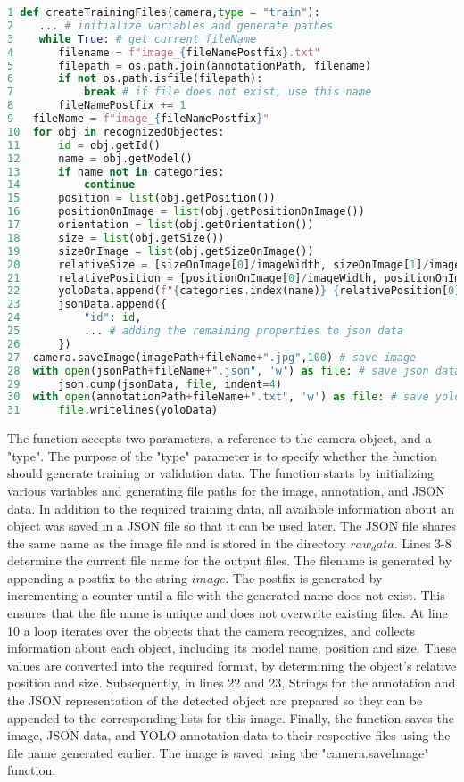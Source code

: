 \begin{lstlisting}[language=python]
1 def createTrainingFiles(camera,type = "train"):
2    ... # initialize variables and generate pathes
3    while True: # get current fileName
4       filename = f"image_{fileNamePostfix}.txt"
5       filepath = os.path.join(annotationPath, filename)
6       if not os.path.isfile(filepath): 
7           break # if file does not exist, use this name
8       fileNamePostfix += 1
9   fileName = f"image_{fileNamePostfix}"
10  for obj in recognizedObjectes:
11      id = obj.getId()
12      name = obj.getModel()
13      if name not in categories:
14          continue
15      position = list(obj.getPosition())
16      positionOnImage = list(obj.getPositionOnImage())
17      orientation = list(obj.getOrientation())
18      size = list(obj.getSize())
19      sizeOnImage = list(obj.getSizeOnImage())
20      relativeSize = [sizeOnImage[0]/imageWidth, sizeOnImage[1]/imageHeight]
21      relativePosition = [positionOnImage[0]/imageWidth, positionOnImage[1]/imageHeight]
22      yoloData.append(f"{categories.index(name)} {relativePosition[0]} {relativePosition[1]} {relativeSize[0]} {relativeSize[1]}\n")
23      jsonData.append({
24          "id": id,
25          ... # adding the remaining properties to json data
26      })
27  camera.saveImage(imagePath+fileName+".jpg",100) # save image
28  with open(jsonPath+fileName+".json", 'w') as file: # save json data
29      json.dump(jsonData, file, indent=4)   
30  with open(annotationPath+fileName+".txt", 'w') as file: # save yolo annotation
31      file.writelines(yoloData)
\end{lstlisting}
The function accepts two parameters, a reference to the camera object, and a "type". The purpose of the "type" parameter is to specify whether the function should generate training or validation data. The function starts by initializing various variables and generating file paths for the image, annotation, and JSON data. In addition to the required training data, all available information about an object was saved in a JSON file so that it can be used later. The JSON file shares the same name as the image file and is stored in the directory \(raw_data\). Lines 3-8 determine the current file name for the output files. The filename is generated by appending a postfix to the string \(image\). The postfix is generated by incrementing a counter until a file with the generated name does not exist. This ensures that the file name is unique and does not overwrite existing files.
At line 10 a loop iterates over the objects that the camera recognizes, and collects information about each object, including its model name, position and size. These values are converted into the required format, by determining the object's relative position and size. Subsequently, in lines 22 and 23, Strings for the annotation and the JSON representation of the detected object are prepared so they can be appended to the corresponding lists for this image. Finally, the function saves the image, JSON data, and YOLO annotation data to their respective files using the file name generated earlier. The image is saved using the "camera.saveImage" function.

